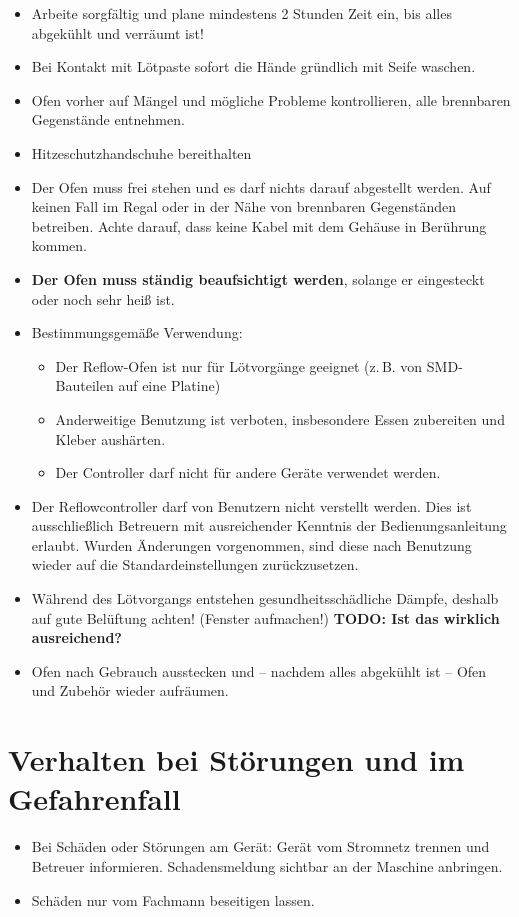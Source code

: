 \documentclass[fontsize=11pt]{scrartcl}
\newcommand{\todo}[1]{\textbf{\color{red}TODO: #1 }}
\begin{document}
\begin{itemize}
	\item Arbeite sorgfältig und plane mindestens 2 Stunden Zeit ein, bis alles abgekühlt und verräumt ist!
\item Bei Kontakt mit Lötpaste sofort die Hände gründlich mit Seife waschen.
	\item Ofen vorher auf Mängel und mögliche Probleme kontrollieren, alle brennbaren Gegenstände entnehmen.
	\item Hitzeschutzhandschuhe bereithalten
\item Der Ofen muss frei stehen und es darf nichts darauf abgestellt werden. Auf keinen Fall im Regal oder in der Nähe von brennbaren Gegenständen betreiben. Achte darauf, dass keine Kabel mit dem Gehäuse in Berührung kommen.
	\item \textbf{Der Ofen muss ständig beaufsichtigt werden}, solange er eingesteckt oder noch sehr heiß ist.
\item Bestimmungsgemäße Verwendung:
\begin{itemize}
\setlength{\itemsep}{-3pt}
\item Der Reflow-Ofen ist nur für Lötvorgänge geeignet (z.\,B. von SMD-Bauteilen auf eine Platine)
\item Anderweitige Benutzung ist verboten, insbesondere Essen zubereiten und Kleber aushärten.
\item Der Controller darf nicht für andere Geräte verwendet werden.
\end{itemize}
	\item Der Reflowcontroller darf von Benutzern nicht verstellt werden. Dies ist ausschließlich Betreuern mit ausreichender Kenntnis der Bedienungsanleitung erlaubt. Wurden Änderungen vorgenommen, sind diese nach Benutzung wieder auf die Standardeinstellungen zurückzusetzen.
	\item Während des Lötvorgangs entstehen gesundheitsschädliche Dämpfe, deshalb auf gute Belüftung achten! (Fenster aufmachen!) \todo{Ist das wirklich ausreichend?}
	\item Ofen nach Gebrauch ausstecken und -- nachdem alles abgekühlt ist -- Ofen und Zubehör wieder aufräumen.
\end{itemize}

\section{Verhalten bei Störungen und im Gefahrenfall}
\begin{itemize}
	\item Bei Schäden oder Störungen am Gerät: Gerät vom Stromnetz trennen und Betreuer informieren. Schadensmeldung sichtbar an der Maschine anbringen.
	\item Schäden nur vom Fachmann beseitigen lassen.
\end{itemize}
\end{document}
